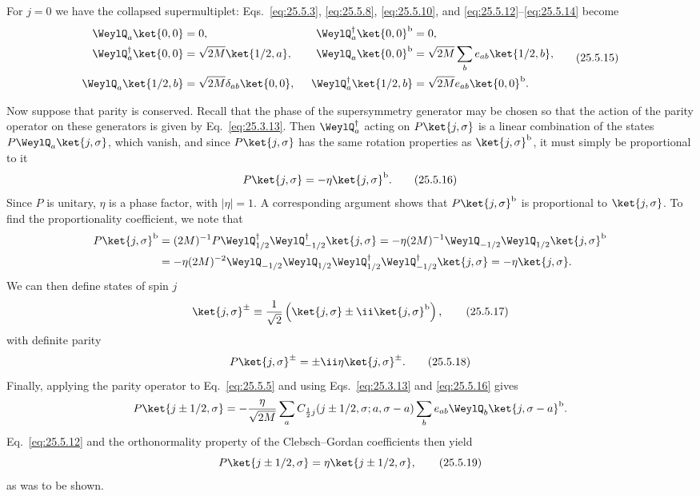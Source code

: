 For $j=0$ we have the collapsed supermultiplet:
Eqs.~\eqref{eq:25.5.3}, \eqref{eq:25.5.8}, \eqref{eq:25.5.10}, and
\eqref{eq:25.5.12}--\eqref{eq:25.5.14} become
\begin{equation}
\begin{alignedat}{2}
 \WeylQ_a\ket{0,0}&=0,
 &\qquad
 \WeylQ_a^\dagger\ket{0,0}^{\mathrm b}&=0,
 \\
 \WeylQ_a^\dagger\ket{0,0}&=\sqrt{2M}\ket{1/2,a},
 &
 \WeylQ_a\ket{0,0}^{\mathrm b}
 &=\sqrt{2M}\sum_b e_{ab}\ket{1/2,b},
 \\
 \WeylQ_a\ket{1/2,b}&=\sqrt{2M}\delta_{ab}\ket{0,0},
 &
 \WeylQ_a^\dagger\ket{1/2,b}
 &=\sqrt{2M}e_{ab}\ket{0,0}^{\mathrm b}.
\end{alignedat}
\tag{25.5.15}\label{eq:25.5.15}
\end{equation}

Now suppose that parity is conserved. Recall that the phase of the
supersymmetry generator may be chosen so that the action of the parity
operator on these generators is given by Eq.~\eqref{eq:25.3.13}. Then
$\WeylQ_a^\dagger$ acting on $P\ket{j,\sigma}$ is a linear combination of the
states $P\WeylQ_a\ket{j,\sigma}$, which vanish, and since
$P\ket{j,\sigma}$ has the same rotation properties as
$\ket{j,\sigma}^{\mathrm b}$, it must simply be proportional to it
\begin{equation}
 P\ket{j,\sigma}=-\eta\ket{j,\sigma}^{\mathrm b}.
\tag{25.5.16}\label{eq:25.5.16}
\end{equation}
Since $P$ is unitary, $\eta$ is a phase factor, with $|\eta|=1$. A
corresponding argument shows that $P\ket{j,\sigma}^{\mathrm b}$ is
proportional to $\ket{j,\sigma}$. To find the proportionality coefficient,
we note that
\[
\begin{aligned}
 P\ket{j,\sigma}^{\mathrm b}
 &=(2M)^{-1}P\WeylQ_{1/2}^\dagger
   \WeylQ_{-1/2}^\dagger\ket{j,\sigma}
 =-\eta(2M)^{-1}\WeylQ_{-1/2}\WeylQ_{1/2}
   \ket{j,\sigma}^{\mathrm b}
 \\
 &=-\eta(2M)^{-2}
   \WeylQ_{-1/2}\WeylQ_{1/2}
   \WeylQ_{1/2}^\dagger\WeylQ_{-1/2}^\dagger\ket{j,\sigma}
 =-\eta\ket{j,\sigma}.
\end{aligned}
\]
We can then define states of spin $j$
\begin{equation}
 \ket{j,\sigma}^{\pm}
 \equiv\frac{1}{\sqrt{2}}
 \left(\ket{j,\sigma}\pm \ii\ket{j,\sigma}^{\mathrm b}\right),
\tag{25.5.17}\label{eq:25.5.17}
\end{equation}
with definite parity
\begin{equation}
 P\ket{j,\sigma}^{\pm}=\pm \ii\eta\ket{j,\sigma}^{\pm}.
\tag{25.5.18}\label{eq:25.5.18}
\end{equation}
Finally, applying the parity operator to Eq.~\eqref{eq:25.5.5} and using
Eqs.~\eqref{eq:25.3.13} and \eqref{eq:25.5.16} gives
\[
 P\ket{j\pm1/2,\sigma}
 =-\frac{\eta}{\sqrt{2M}}\sum_a
 C_{\frac12 j}(j\pm1/2,\sigma;a,\sigma-a)
 \sum_b e_{ab}\WeylQ_b\ket{j,\sigma-a}^{\mathrm b}.
\]
Eq.~\eqref{eq:25.5.12} and the orthonormality property of the
Clebsch--Gordan coefficients then yield
\begin{equation}
 P\ket{j\pm1/2,\sigma}=\eta\ket{j\pm1/2,\sigma},
\tag{25.5.19}\label{eq:25.5.19}
\end{equation}
as was to be shown.

